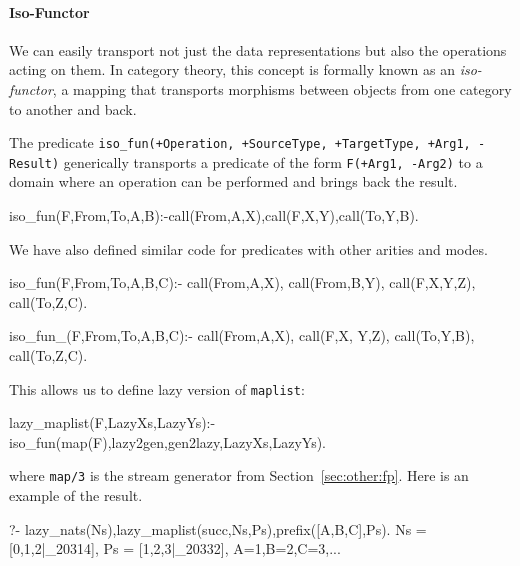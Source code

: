 \documentclass[submission,copyright,creativecommons]{eptcs}
\begin{document}
\paragraph{Iso-Functor}
We can easily transport not just the data representations but also the
operations acting on them. In category theory, this concept is formally known
as an {\em iso-functor}, a mapping that transports morphisms between objects
from one category to another and back. 

The predicate 
{\tt iso\_fun(+Operation, +SourceType, +TargetType, +Arg1, -Result)}
generically transports a predicate of the form {\tt F(+Arg1, -Arg2)} to a domain where
an operation can be performed and brings back the result.

\begin{code}
iso_fun(F,From,To,A,B):-call(From,A,X),call(F,X,Y),call(To,Y,B).
\end{code}
We have also defined similar code for predicates with other arities and modes.

\begin{codeh}
%
iso_fun(F,From,To,A,B,C):-
  call(From,A,X),
  call(From,B,Y),
  call(F,X,Y,Z),
  call(To,Z,C).

%
iso_fun_(F,From,To,A,B,C):- 
  call(From,A,X),
  call(F,X, Y,Z), %
  call(To,Y,B),
  call(To,Z,C).
\end{codeh}

This allows us to define lazy version of {\tt maplist}:
\begin{code}
lazy_maplist(F,LazyXs,LazyYs):-iso_fun(map(F),lazy2gen,gen2lazy,LazyXs,LazyYs).
\end{code}
where {\tt map/3} is the stream generator from Section~\ref{sec:other:fp}. Here
is an example of the result.
\begin{codex}
?- lazy_nats(Ns),lazy_maplist(succ,Ns,Ps),prefix([A,B,C],Ps).
Ns = [0,1,2|_20314], Ps = [1,2,3|_20332], A=1,B=2,C=3,...
\end{codex}
\end{document}
